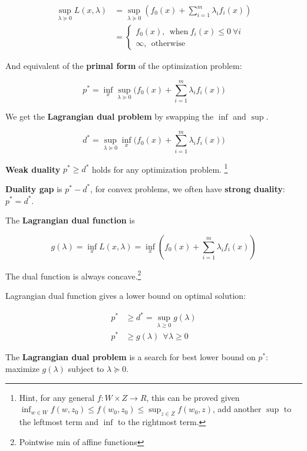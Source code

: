 \documentclass{article}
\DeclareMathOperator*{\minf}{inf}
\DeclareMathOperator*{\msup}{sup}
\begin{document}
\begin{align*}
\msup_{\lambda \succeq 0}{L(x, \lambda)} &= \msup_{\lambda \succeq 0}{( f_0(x) + \sum_{i = 1}^{m}{\lambda_i f_i(x)} )} \\
                                         &= \begin{cases}
                                              f_0(x), ~ ~ \text{when} ~ f_i(x) \leq 0 ~ \forall i \\
                                              \infty, ~ ~ \text{otherwise}
                                            \end{cases}
\end{align*}

And equivalent of the \textbf{primal form} of the optimization problem:

$$
p^* = \minf_{x}{ \msup_{\lambda \succeq 0}{(f_0(x) + \sum_{i = 1}^{m}{\lambda_i f_i(x)}} )}
$$

We get the \textbf{Lagrangian dual problem} by swapping the $\minf$ and $\msup$.

$$
d^* = \msup_{\lambda \succeq 0}{ \minf_{x}{(f_0(x) + \sum_{i = 1}^{m}{\lambda_i f_i(x)}} )}
$$

\textbf{Weak duality} $p^* \geq d^*$ holds for any optimization problem.
\footnote{Hint, for any general $f: W \times Z \to R$, this can be proved given $\minf_{w \in W}{f(w, z_0)} \leq f(w_0, z_0) \leq \msup_{z \in Z}{f(w_0, z)}$, add another $\msup$ to the leftmost term and $\minf$ to the rightmost term.}

\textbf{Duality gap} is $p^* - d^*$, for convex problems, we often have \textbf{strong duality}: $p^* = d^*$.

The \textbf{Lagrangian dual function} is

$$
g(\lambda) = \minf_{x}{L(x, \lambda)} = \minf_{x}{( f_0(x) + \sum_{i = 1}^{m}{\lambda_i f_i(x)} )}
$$

The dual function is always concave.\footnote{Pointwise min of affine functions}

Lagrangian dual function gives a lower bound on optimal solution:

\begin{align*}
p^* &\geq d^* = \msup_{\lambda \geq 0}{g(\lambda)} \\
p^* &\geq g(\lambda) ~ ~ \forall \lambda \geq 0
\end{align*}

The \textbf{Lagrangian dual problem} is a search for best lower bound on $p^*$: maximize $g(\lambda)$ subject to $\lambda \succeq 0$.
\end{document}
